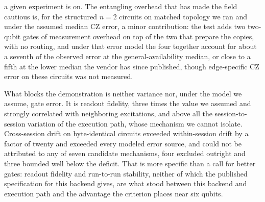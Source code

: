 %
%

a given experiment is on. The entangling overhead that has made the field
cautious is, for the structured \(n = 2\) circuits on matched topology we
ran and under the assumed median CZ error, a minor contribution: the test
adds two two-qubit gates of measurement overhead on top of the two that
prepare the copies, with no routing, and under that error model the four
together account for about a seventh of the observed error at the
general-availability median, or close to a fifth at the lower median the
vendor has since published, though edge-specific CZ error on these
circuits was not measured.

What blocks the demonstration is neither variance nor, under the model we
assume, gate error. It is readout fidelity, three times the value we
assumed and strongly correlated with neighboring excitations, and above
all the session-to-session variation of the execution path, whose
mechanism we cannot isolate. Cross-session drift on byte-identical
circuits exceeded within-session drift by a factor of twenty and exceeded
every modeled error source, and could not be attributed to any of seven
candidate mechanisms, four excluded outright and three bounded well below
the deficit. That is more specific than a call for better gates: readout
fidelity and run-to-run stability, neither of which the published
specification for this backend gives, are what stood between this backend
and execution path and the advantage the criterion places near six
qubits.
